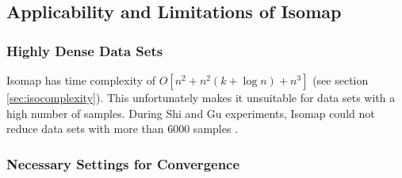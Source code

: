 \documentclass[12pt]{article}
\begin{document}
\subsection{Applicability and Limitations of Isomap}

\subsubsection{Highly Dense Data Sets}

Isomap has time complexity of $O[n^2 + n^2(k + \log n) + n^3]$ (see section \ref{sec:isocomplexity}). This unfortunately makes it unsuitable for data sets with a high number of samples. During Shi and Gu experiments, Isomap could not reduce data sets with more than 6000 samples \cite{shi2012fast}.

\subsubsection{Necessary Settings for Convergence}
\end{document}

